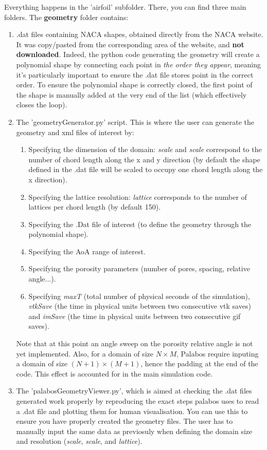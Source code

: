 \documentclass{article}
\begin{document}
Everything happens in the 'airfoil' subfolder. 
There, you can find three main folders.
The \textbf{geometry} folder contains: 
\begin{enumerate}
    \item .dat files containing NACA shapes, obtained directly from the NACA website. It was copy/pasted from the corresponding area of the website, and \textbf{not downloaded}. Indeed, the python code generating the geometry will create a polynomial shape by connecting each point in \emph{the order they appear}, meaning it's particularly important to ensure the .dat file stores point in the correct order. To ensure the polynomial shape is correctly closed, the first point of the shape is manually added at the very end of the list (which effectively closes the loop).
    \item The 'geometryGenerator.py' script. This is where the user can generate the geometry and xml files of interest by: 
    \begin{enumerate}
        \item Specifying the dimension of the domain: \textit{scale} and \textit{scale} correspond to the number of chord length along the x and y direction (by default the shape defined in the .dat file will be scaled to occupy one chord length along the x direction).
        \item Specifying the lattice resolution: \textit{lattice} corresponds to the number of lattices per chord length (by default 150).
        \item Specifying the .Dat file of interest (to define the geometry through the polynomial shape).
        \item Specifying the AoA range of interest.
        \item Specifying the porosity parameters (number of pores, spacing, relative angle...).
        \item Specifying \textit{maxT} (total number of physical seconds of the simulation), \textit{vtkSave} (the time in physical units between two consecutive vtk saves) and \textit{imSave} (the time in physical units between two consecutive gif saves).
    \end{enumerate}
    Note that at this point an angle sweep on the porosity relative angle is not yet implemented. Also, for a domain of size $N\times{M}$, Palabos require inputing a domain of size $(N+1)\times{(M+1)}$, hence the padding at the end of the code. This effect is accounted for in the main simulation code.
    
     \item The 'palabosGeometryViewer.py', which is aimed at checking the .dat files generated work properly by reproducing the exact steps palabos uses to read a .dat file and plotting them for human visualisation. You can use this to ensure you have properly created the geometry files. The user has to manually input the same data as previosuly when defining the domain size and resolution (\textit{scale}, \textit{scale}, and  \textit{lattice}).
     
\end{enumerate}
\end{document}
